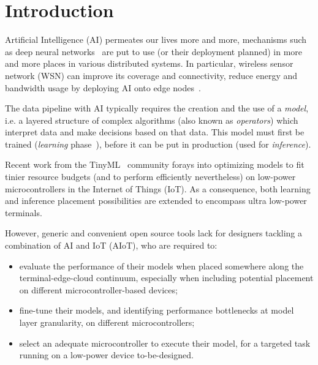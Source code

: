 \section{Introduction}
% 
% 
% 
% 
Artificial Intelligence (AI) permeates our lives more and more, mechanisms such as deep neural networks~\cite{sze2017dnn} are put to use (or their deployment planned) in more and more places in various distributed systems. In particular, wireless sensor network (WSN) can improve its coverage and connectivity, reduce energy and bandwidth usage by deploying AI onto edge nodes~\cite{electronics10091012}.

The data pipeline with AI typically requires the creation and the use of a \emph{model}, i.e. a layered structure of complex algorithms (also known as \emph{operators}) which interpret data and make decisions based on that data. This model must first be trained (\emph{learning} phase~\cite{sze2017dnn}), before it can be put in production (used for \emph{inference}).

Recent work from the  TinyML~\cite{sanchez2020tinyml,ray2022tinyml-review} community forays into optimizing models to fit tinier resource budgets (and to perform efficiently nevertheless) on low-power microcontrollers in the Internet of Things (IoT). As a consequence, both learning and inference placement possibilities are extended to encompass ultra low-power terminals.

However, generic and convenient open source tools lack for designers tackling a combination of AI and IoT (AIoT), who are required to:
\begin{itemize}
    \item evaluate the performance of their models when placed somewhere along the terminal-edge-cloud continuum, especially when including potential placement on different microcontroller-based devices;
    \item fine-tune their models, and identifying performance bottlenecks at model layer granularity, on different microcontrollers;
    \item select an adequate microcontroller to execute their model, for a targeted task running on a low-power device to-be-designed.
\end{itemize}

